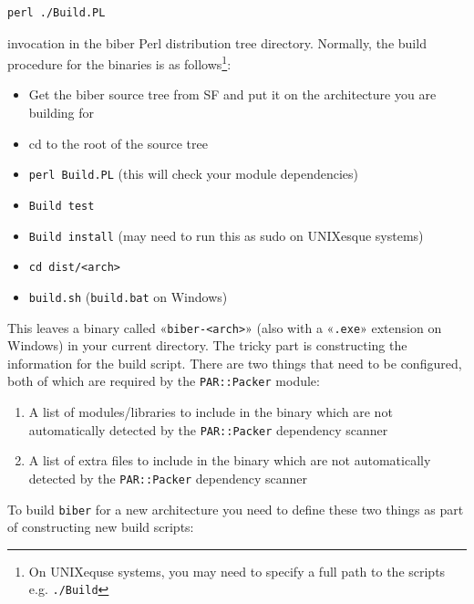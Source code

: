 \documentclass{ltxdockit}
\begin{document}
\begin{verbatim}
perl ./Build.PL
\end{verbatim}

\noindent invocation in the biber Perl distribution tree
directory. Normally, the build procedure for the binaries is as
follows\footnote{On UNIXequse systems, you may need to specify a full
  path to the scripts e.g. \texttt{./Build}}:

\begin{itemize}
\item Get the biber source tree from SF and put it on the architecture
  you are building for
\item cd to the root of the source tree
\item \verb+perl Build.PL+ (this will check your module
  dependencies)
\item \verb+Build test+
\item \verb+Build install+ (may need to run this as sudo on
  UNIXesque systems)
\item \verb+cd dist/<arch>+
\item \verb+build.sh+ (\verb+build.bat+ on Windows)
\end{itemize}

\noindent This leaves a binary called «\verb+biber-<arch>+» (also with
a «\verb+.exe+» extension on Windows) in your current directory.
The tricky part is constructing the information for the build
script. There are two things that need to be configured, both of
which are required by the \verb+PAR::Packer+ module:

\begin{enumerate}
\item A list of modules/libraries to include in the binary which are not
  automatically detected by the \verb+PAR::Packer+ dependency
  scanner
\item A list of extra files to include in the binary which are not
  automatically detected by the \verb+PAR::Packer+ dependency
  scanner
\end{enumerate}

\noindent To build \verb+biber+ for a new architecture you need to
define these two things as part of constructing new build scripts:
\end{document}
